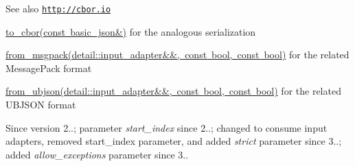 \begin{DoxySeeAlso}{See also}
\href{http://cbor.io}{\tt http\+://cbor.\+io} 

\mbox{\hyperlink{classnlohmann_1_1basic__json_a2566783e190dec524bf3445b322873b8}{to\+\_\+cbor(const basic\+\_\+json\&)}} for the analogous serialization 

\mbox{\hyperlink{classnlohmann_1_1basic__json_a11458b7982adba51bc634f2f8c961e9b}{from\+\_\+msgpack(detail\+::input\+\_\+adapter\&\&, const bool, const bool)}} for the related Message\+Pack format 

\mbox{\hyperlink{classnlohmann_1_1basic__json_a1ed52b463d2ef14c85ed076467168c72}{from\+\_\+ubjson(detail\+::input\+\_\+adapter\&\&, const bool, const bool)}} for the related U\+B\+J\+S\+ON format
\end{DoxySeeAlso}
\begin{DoxySince}{Since}
version 2..; parameter {\itshape start\+\_\+index} since 2..; changed to consume input adapters, removed start\+\_\+index parameter, and added {\itshape strict} parameter since 3..; added {\itshape allow\+\_\+exceptions} parameter since 3.. 
\end{DoxySince}
\mbox{\label{classnlohmann_1_1basic__json_a513d6fb63a0ea53ce6c28c05ce0f26e6}} 

